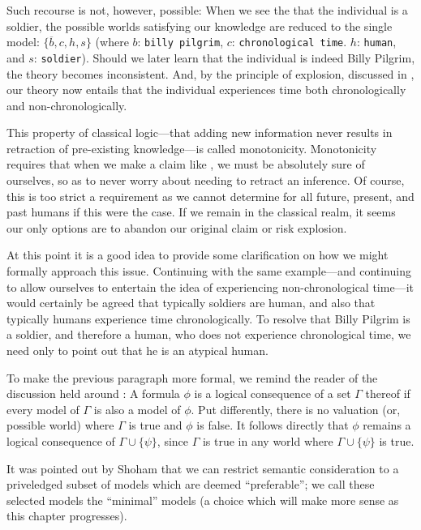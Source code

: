 Such recourse is not, however, possible: When we see the that the individual is a soldier, the possible worlds satisfying our knowledge are reduced to the single model: $\{\overline{b},c,h,s\}$ (where $b$: \texttt{billy pilgrim}, $c$: \texttt{chronological time}. $h$: \texttt{human}, and $s$: \texttt{soldier}). Should we later learn that the individual is indeed Billy Pilgrim, the theory becomes inconsistent.
And, by the principle of explosion, discussed in , our theory now entails that the individual experiences time both chronologically and non-chronologically.

This property of classical logic---that adding new information never results in retraction of pre-existing knowledge---is called monotonicity. Monotonicity requires that when we make a claim like , we must be absolutely sure of ourselves, so as to never worry about needing to retract an inference. Of course, this is too strict a requirement as we cannot determine for all future, present, and past humans if this were the case. If we remain in the classical realm, it seems our only options are to abandon our original claim or risk explosion.

At this point it is a good idea to provide some clarification on how we might formally approach this issue. Continuing with the same example---and continuing to allow ourselves to entertain the idea of experiencing non-chronological time---it would certainly be agreed that typically soldiers are human, and also that typically humans experience time chronologically. To resolve that Billy Pilgrim is a soldier, and therefore a human, who does not experience chronological time, we need only to point out that he is an atypical human.

To make the previous paragraph more formal, we remind the reader of the discussion held around : A formula $\phi$ is a logical consequence of a set $\Gamma$ thereof if every model of $\Gamma$ is also a model of $\phi$. Put differently, there is no valuation (or, possible world) where $\Gamma$ is true and $\phi$ is false. It follows directly that $\phi$ remains a logical consequence of $\Gamma \cup \{\psi\}$, since $\Gamma$ is true in any world where $\Gamma \cup \{\psi\}$ is true.

It was pointed out by Shoham \cite{shohamSemanticApproach} that we can restrict semantic consideration to a priveledged subset of models which are deemed ``preferable''; we call these selected models the ``minimal'' models (a choice which will make more sense as this chapter progresses).

